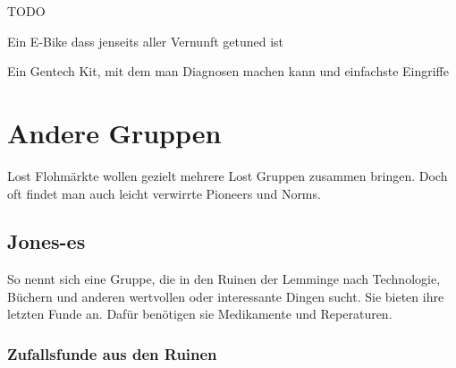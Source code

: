 \begin{npcBox}[title=Flash]
    \begin{stressSection}
    \end{stressSection}
    \begin{tabularx}{\textwidth}{ XX }
    \end{tabularx}

    \begin{consequences}
    \item {}
    \item {}
    \item {}
    \end{consequences}

    \begin{npcDescription}
    TODO
    \end{npcDescription}


    \begin{equipment}
    \item Ein E-Bike dass jenseits aller Vernunft getuned ist
    \item Ein Gentech Kit, mit dem man Diagnosen machen kann und einfachste Eingriffe
    \end{equipment}
\end{npcBox}
\newpage

\chapter{Andere Gruppen}

Lost Flohmärkte wollen gezielt mehrere Lost Gruppen zusammen bringen. Doch oft findet man auch leicht verwirrte Pioneers und Norms.

\section{Jones-es}

So nennt sich eine Gruppe, die in den Ruinen der Lemminge nach Technologie, Büchern und anderen wertvollen oder interessante Dingen sucht. Sie bieten ihre letzten Funde an. Dafür benötigen sie Medikamente und Reperaturen.

\subsection{Zufallsfunde aus den Ruinen}

